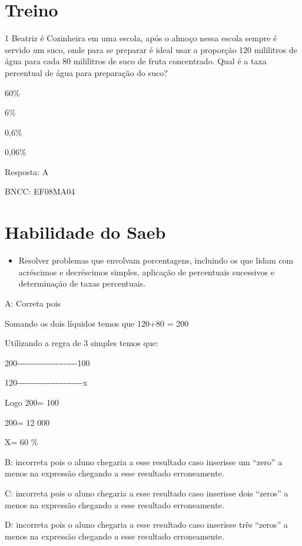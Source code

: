 \section{Treino}

\num{1} Beatriz é Cozinheira em uma escola, após o almoço nessa escola sempre
é servido um suco, onde para se preparar é ideal usar a proporção 120
mililitros de água para cada 80 mililitros de suco de fruta concentrado.
Qual é a taxa percentual de água para preparação do suco?

\item 60\%
\item 6\%
\item 0,6\%
\item 0,06\%

Resposta: A

BNCC: EF08MA04

\section{Habilidade do Saeb}

\begin{itemize}
\tightlist

\item 
  Resolver problemas que envolvam porcentagens, incluindo os que lidam
  com acréscimos e decréscimos simples, aplicação de percentuais
  sucessivos e determinação de taxas percentuais.
\end{itemize}

A: Correta pois

Somando os dois líquidos temos que 120+80 = 200

Utilizando a regra de 3 simples temos que:

200-\/-\/-\/-\/-\/-\/-\/-\/-\/-\/-\/-\/-\/-\/-\/-\/-\/-\/-\/-\/-\/-100

120-\/-\/-\/-\/-\/-\/-\/-\/-\/-\/-\/-\/-\/-\/-\/-\/-\/-\/-\/-\/-\/-\/-\/-x

Logo 200\times \times = 100

200\times = 12 000

X= 60 \%

B: incorreta pois o aluno chegaria a esse resultado caso inserisse um
``zero'' a menos na expressão chegando a esse resultado erroneamente.

C: incorreta pois o aluno chegaria a esse resultado caso inserisse dois
``zeros'' a menos na expressão chegando a esse resultado erroneamente.

D: incorreta pois o aluno chegaria a esse resultado caso inserisse três
``zeros'' a menos na expressão chegando a esse resultado erroneamente.

